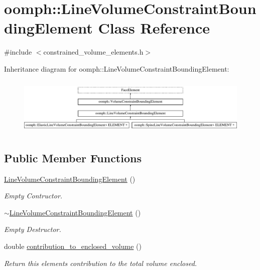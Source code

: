 \hypertarget{classoomph_1_1LineVolumeConstraintBoundingElement}{}\section{oomph\+:\+:Line\+Volume\+Constraint\+Bounding\+Element Class Reference}
\label{classoomph_1_1LineVolumeConstraintBoundingElement}


{\ttfamily \#include $<$constrained\+\_\+volume\+\_\+elements.\+h$>$}

Inheritance diagram for oomph\+:\+:Line\+Volume\+Constraint\+Bounding\+Element\+:\begin{figure}[H]
\begin{center}
\leavevmode
\includegraphics[height=2.786070cm]{classoomph_1_1LineVolumeConstraintBoundingElement}
\end{center}
\end{figure}
\subsection*{Public Member Functions}
\begin{DoxyCompactItemize}
\item 
\hyperlink{classoomph_1_1LineVolumeConstraintBoundingElement_a39baabe26bcf3958b80fe3dd5430c347}{Line\+Volume\+Constraint\+Bounding\+Element} ()
\begin{DoxyCompactList}\small\item\em Empty Contructor. \end{DoxyCompactList}\item 
\hyperlink{classoomph_1_1LineVolumeConstraintBoundingElement_a905d0b20f7f9a009d07c7d4506b404ed}{$\sim$\+Line\+Volume\+Constraint\+Bounding\+Element} ()
\begin{DoxyCompactList}\small\item\em Empty Destructor. \end{DoxyCompactList}\item 
double \hyperlink{classoomph_1_1LineVolumeConstraintBoundingElement_a099357dfeca3c4e1d84b0979cd495da9}{contribution\+\_\+to\+\_\+enclosed\+\_\+volume} ()
\begin{DoxyCompactList}\small\item\em Return this element\textquotesingle{}s contribution to the total volume enclosed. \end{DoxyCompactList}\end{DoxyCompactItemize}
